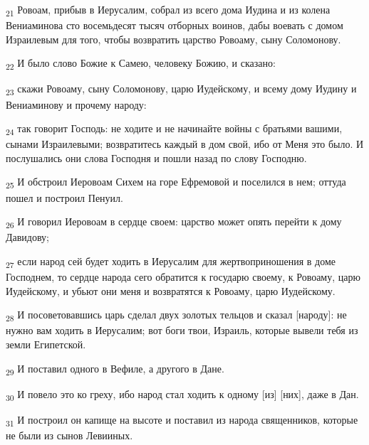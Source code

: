 \begin{tcolorbox}
\textsubscript{21} Ровоам, прибыв в Иерусалим, собрал из всего дома Иудина и из колена Вениаминова сто восемьдесят тысяч отборных воинов, дабы воевать с домом Израилевым для того, чтобы возвратить царство Ровоаму, сыну Соломонову.
\end{tcolorbox}
\begin{tcolorbox}
\textsubscript{22} И было слово Божие к Самею, человеку Божию, и сказано:
\end{tcolorbox}
\begin{tcolorbox}
\textsubscript{23} скажи Ровоаму, сыну Соломонову, царю Иудейскому, и всему дому Иудину и Вениаминову и прочему народу:
\end{tcolorbox}
\begin{tcolorbox}
\textsubscript{24} так говорит Господь: не ходите и не начинайте войны с братьями вашими, сынами Израилевыми; возвратитесь каждый в дом свой, ибо от Меня это было. И послушались они слова Господня и пошли назад по слову Господню.
\end{tcolorbox}
\begin{tcolorbox}
\textsubscript{25} И обстроил Иеровоам Сихем на горе Ефремовой и поселился в нем; оттуда пошел и построил Пенуил.
\end{tcolorbox}
\begin{tcolorbox}
\textsubscript{26} И говорил Иеровоам в сердце своем: царство может опять перейти к дому Давидову;
\end{tcolorbox}
\begin{tcolorbox}
\textsubscript{27} если народ сей будет ходить в Иерусалим для жертвоприношения в доме Господнем, то сердце народа сего обратится к государю своему, к Ровоаму, царю Иудейскому, и убьют они меня и возвратятся к Ровоаму, царю Иудейскому.
\end{tcolorbox}
\begin{tcolorbox}
\textsubscript{28} И посоветовавшись царь сделал двух золотых тельцов и сказал [народу]: не нужно вам ходить в Иерусалим; вот боги твои, Израиль, которые вывели тебя из земли Египетской.
\end{tcolorbox}
\begin{tcolorbox}
\textsubscript{29} И поставил одного в Вефиле, а другого в Дане.
\end{tcolorbox}
\begin{tcolorbox}
\textsubscript{30} И повело это ко греху, ибо народ стал ходить к одному [из] [них], даже в Дан.
\end{tcolorbox}
\begin{tcolorbox}
\textsubscript{31} И построил он капище на высоте и поставил из народа священников, которые не были из сынов Левииных.
\end{tcolorbox}
